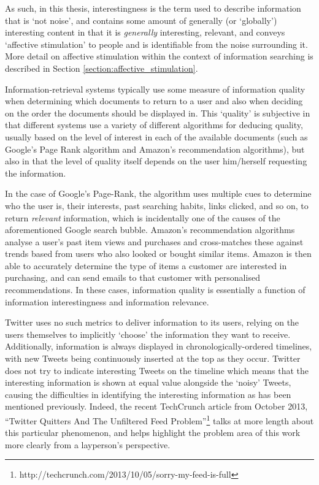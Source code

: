 As such, in this thesis, interestingness is the term used to describe information that is `not noise', and contains some amount of generally (or `globally') interesting content in that it is \textit{generally} interesting, relevant, and conveys `affective stimulation' to people and is identifiable from the noise surrounding it. More detail on affective stimulation within the context of information searching is described in Section \ref{section:affective_stimulation}. 

Information-retrieval systems typically use some measure of information quality when determining which documents to return to a user and also when deciding on the order the documents should be displayed in. This `quality' is subjective in that different systems use a variety of different algorithms for deducing quality, usually based on the level of interest in each of the available documents (such as Google's Page Rank algorithm and Amazon's recommendation algorithms), but also in that the level of quality itself depends on the user him/herself requesting the information. 

In the case of Google's Page-Rank, the algorithm uses multiple cues to determine who the user is, their interests, past searching habits, links clicked, and so on, to return \textit{relevant} information, which is incidentally one of the causes of the aforementioned Google search bubble. Amazon's recommendation algorithms analyse a user's past item views and purchases and cross-matches these against trends based from users who also looked or bought similar items. Amazon is then able to accurately determine the type of items a customer are interested in purchasing, and can send emails to that customer with personalised recommendations. In these cases, information quality is essentially a function of information interestingness and information relevance.

Twitter uses no such metrics to deliver information to its users, relying on the users themselves to implicitly `choose' the information they want to receive. Additionally, information is always displayed in chronologically-ordered timelines, with new Tweets being continuously inserted at the top as they occur. Twitter does not try to indicate interesting Tweets on the timeline which means that the interesting information is shown at equal value alongside the `noisy' Tweets, causing the difficulties in identifying the interesting information as has been mentioned previously. Indeed, the recent TechCrunch article from October 2013, ``Twitter Quitters And The Unfiltered Feed Problem''\footnote{http://techcrunch.com/2013/10/05/sorry-my-feed-is-full} talks at more length about this particular phenomenon, and helps highlight the problem area of this work more clearly from a layperson's perspective.

